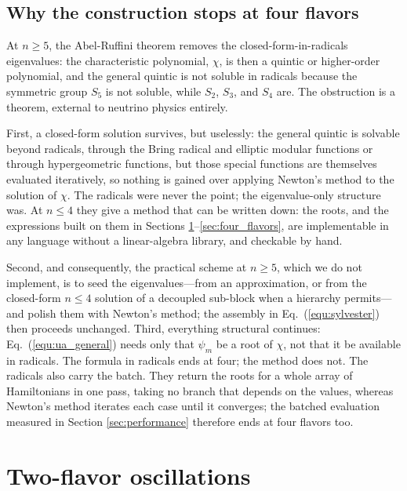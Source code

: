 \documentclass[final,5p,times,twocolumn,sort,compress]{elsarticle}
\newcommand{\eq}{Eq.}
\newcommand{\equ}[1]{\eq~(\ref{equ:#1})}
\begin{document}
\subsection{Why the construction stops at four flavors}
\label{sec:beyond_four}

At $n \geq 5$, the Abel-Ruffini theorem removes the closed-form-in-radicals eigenvalues: the characteristic polynomial, $\chi$, is then a quintic or higher-order polynomial, and the general quintic is not soluble in radicals because the symmetric group $S_5$ is not soluble, while $S_2$, $S_3$, and $S_4$ are.  The obstruction is a theorem, external to neutrino physics entirely.

First, a closed-form solution survives, but uselessly: the general quintic is solvable beyond radicals, through the Bring radical and elliptic modular functions or through hypergeometric functions, but those special functions are themselves evaluated iteratively, so nothing is gained over applying Newton's method to the solution of $\chi$.  The radicals were never the point; the eigenvalue-only structure was.  At $n \leq 4$ they give a method that can be written down: the roots, and the expressions built on them in Sections \ref{sec:two_flavors}--\ref{sec:four_flavors}, are implementable in any language without a linear-algebra library, and checkable by hand.  

Second, and consequently, the practical scheme at $n \geq 5$, which we do not implement, is to seed the eigenvalues---from an approximation, or from the closed-form $n \leq 4$ solution of a decoupled sub-block when a hierarchy permits---and polish them with Newton's method; the assembly in \equ{sylvester} then proceeds unchanged.  Third, everything structural continues: \equ{ua_general} needs only that $\psi_m$ be a root of $\chi$, not that it be available in radicals.  The formula in radicals ends at four; the method does not.  The radicals also carry the batch.  They return the roots for a whole array of Hamiltonians in one pass, taking no branch that depends on the values, whereas Newton's method iterates each case until it converges; the batched evaluation measured in Section \ref{sec:performance} therefore ends at four flavors too.


\section{Two-flavor oscillations}
\label{sec:two_flavors}
\end{document}
